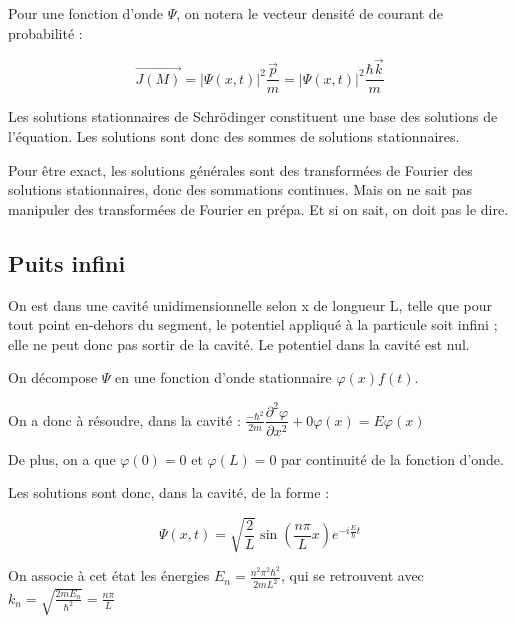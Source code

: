 \documentclass[a4paper,12pt]{book}
\newcommand{\Def}[2]{\begin{tcolorbox}[colback=white,colframe=red!10!green!20!blue!75!, title=Définition : #1]#2\end{tcolorbox}}
\newcommand{\Thr}[2]{\begin{tcolorbox}[sharp corners, colback=white,colframe=red!10!blue!30!green!75!, title=Théorème : #1]#2\end{tcolorbox}}
\renewcommand{\Vec}[1]{\overrightarrow{#1}}
\begin{document}
\Def{Vecteur densité de probabilité}{Pour une fonction d'onde $\Psi$, on notera le vecteur densité de courant de probabilité :
\par $$\Vec{J(M)} = \vert\Psi(x,t)\vert^2\frac{\Vec{p}}{m} = \vert\Psi(x,t)\vert^2\frac{\hbar\Vec{k}}{m}$$}
\Thr{Utilité des ondes stationnaires}{Les solutions stationnaires de Schrödinger constituent une base des solutions de l'équation. Les solutions sont donc des sommes de solutions stationnaires.
\par Pour être exact, les solutions générales sont des transformées de Fourier des solutions stationnaires, donc des sommations continues. Mais on ne sait pas manipuler des transformées de Fourier en prépa. Et si on sait, on doit pas le dire.}

\subsection{Puits infini}
\Def{Présentation du problème}{On est dans une cavité unidimensionnelle selon x de longueur L, telle que pour tout point en-dehors du segment, le potentiel appliqué à la particule soit infini ; elle ne peut donc pas sortir de la cavité. Le potentiel dans la cavité est nul.
\par On décompose $\Psi$ en une fonction d'onde stationnaire $\varphi(x)f(t)$.
\par On a donc à résoudre, dans la cavité : $\frac{-\hbar^2}{2m}\dfrac{\partial^2\varphi}{\partial x^2} +0\varphi(x) = E\varphi(x)$
\par De plus, on a que $\varphi(0) = 0$ et $\varphi(L)=0$ par continuité de la fonction d'onde.}
\Thr{Solutions}{Les solutions sont donc, dans la cavité, de la forme :
\par $$\Psi(x,t)=\sqrt{\frac{2}{L}}\sin\left(\frac{n\pi}{L}x\right)e^{-i\frac{E}{\hbar}t}$$
\par On associe à cet état les énergies $E_n = \frac{n^2\pi^2\hbar^2}{2m L^2}$, qui se retrouvent avec $k_n = \sqrt{\frac{2mE_n}{\hbar^2}}= \frac{n\pi}{L}$}
\end{document}
